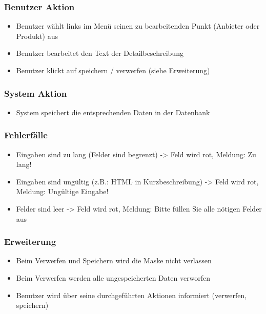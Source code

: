 \documentclass[a4paper,12pt]{article}
\begin{document}
\subsubsection{Benutzer Aktion}\label{benutzer-aktion-3}

\begin{itemize}

\item
  Benutzer wählt links im Menü seinen zu bearbeitenden Punkt (Anbieter
  oder Produkt) aus
\item
  Benutzer bearbeitet den Text der Detailbeschreibung
\item
  Benutzer klickt auf speichern / verwerfen (siehe Erweiterung)
\end{itemize}

\subsubsection{System Aktion}\label{system-aktion-3}

\begin{itemize}

\item
  System speichert die entsprechenden Daten in der Datenbank
\end{itemize}

\subsubsection{Fehlerfälle}\label{fehlerfalle-3}

\begin{itemize}

\item
  Eingaben sind zu lang (Felder sind begrenzt) -\textgreater{} Feld wird
  rot, Meldung: Zu lang!
\item
  Eingaben sind ungültig (z.B.: HTML in Kurzbeschreibung)
  -\textgreater{} Feld wird rot, Meldung: Ungültige Eingabe!
\item
  Felder sind leer -\textgreater{} Feld wird rot, Meldung: Bitte füllen
  Sie alle nötigen Felder aus
\end{itemize}

\subsubsection{Erweiterung}\label{erweiterung-3}

\begin{itemize}

\item
  Beim Verwerfen und Speichern wird die Maske nicht verlassen
\item
  Beim Verwerfen werden alle ungespeicherten Daten verworfen
\item
  Benutzer wird über seine durchgeführten Aktionen informiert
  (verwerfen, speichern)
\end{itemize}
\end{document}
